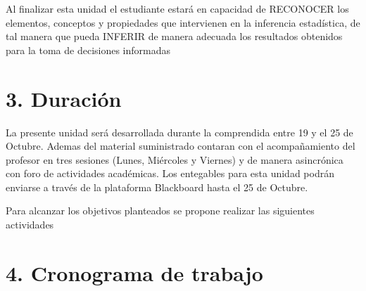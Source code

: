 \documentclass[base=hide,11pt]{elegantbook}
\begin{document}
Al finalizar esta unidad el estudiante estará en capacidad de RECONOCER los elementos, conceptos y propiedades que intervienen en la inferencia estadística, de tal manera que pueda INFERIR de manera adecuada los resultados obtenidos para la toma de decisiones informadas


\section*{3. Duración}
La presente  unidad será desarrollada durante la comprendida entre 19 y el 25 de Octubre.    
Ademas del material suministrado  contaran con el acompañamiento del profesor en tres sesiones (Lunes, Miércoles y Viernes) y de manera asincrónica con  foro de actividades académicas. Los entegables para esta unidad podrán enviarse a través de la plataforma Blackboard hasta el  25 de Octubre.

Para alcanzar los objetivos planteados se propone realizar las siguientes actividades
% 	
\section*{4. Cronograma de trabajo}
\end{document}
